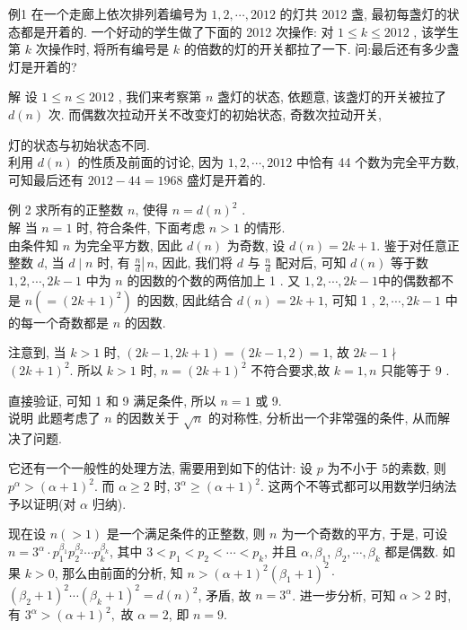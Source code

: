 例1 在一个走廊上依次排列着编号为 $1,2, \cdots, 2012$ 的灯共 2012 盏, 最初每盏灯的状态都是开着的. 一个好动的学生做了下面的 2012 次操作: 对 $1 \leqslant k \leqslant 2012$ , 该学生第 $k$ 次操作时, 将所有编号是 $k$ 的倍数的灯的开关都拉了一下. 问:最后还有多少盏灯是开着的?

解 设 $1 \leqslant n \leqslant 2012$ , 我们来考察第 $n$ 盏灯的状态, 依题意, 该盏灯的开关被拉了 $d(n)$ 次. 而偶数次拉动开关不改变灯的初始状态, 奇数次拉动开关,

灯的状态与初始状态不同.\\
利用 $d(n)$ 的性质及前面的讨论, 因为 $1,2, \cdots, 2012$ 中恰有 44 个数为完全平方数, 可知最后还有 $2012-44=1968$ 盛灯是开着的.

例 2 求所有的正整数 $n$, 使得 $n=d(n)^{2}$ . \\
解 当 $n=1$ 时, 符合条件, 下面考虑 $n>1$ 的情形.\\
由条件知 $n$ 为完全平方数, 因此 $d(n)$ 为奇数, 设 $d(n)=2 k+1$. 鉴于对任意正整数 $d$, 当 $d \mid n$ 时, 有 $\left.\frac{n}{d} \right\rvert\, n$, 因此, 我们将 $d$ 与 $\frac{n}{d}$ 配对后, 可知 $d(n)$ 等于数 $1,2, \cdots, 2 k-1$ 中为 $n$ 的因数的个数的两倍加上 1 . 又 $1,2, \cdots, 2 k-1$中的偶数都不是 $n\left(=(2 k+1)^{2}\right)$ 的因数, 因此结合 $d(n)=2 k+1$, 可知 1 , $2, \cdots, 2 k-1$ 中的每一个奇数都是 $n$ 的因数.

注意到, 当 $k>1$ 时, $(2 k-1,2 k+1)=(2 k-1,2)=1$, 故 $2 k-1 \nmid$ $(2 k+1)^{2}$. 所以 $k>1$ 时, $n=(2 k+1)^{2}$ 不符合要求,故 $k=1, n$ 只能等于 9 .

直接验证, 可知 1 和 9 满足条件, 所以 $n=1$ 或 9.\\
说明 此题考虑了 $n$ 的因数关于 $\sqrt{n}$ 的对称性, 分析出一个非常强的条件, 从而解决了问题.

它还有一个一般性的处理方法, 需要用到如下的估计: 设 $p$ 为不小于 5的素数, 则 $p^{\alpha}>(\alpha+1)^{2}$. 而 $\alpha \geqslant 2$ 时, $3^{\alpha} \geqslant(\alpha+1)^{2}$. 这两个不等式都可以用数学归纳法予以证明(对 $\alpha$ 归纳).

现在设 $n(>1)$ 是一个满足条件的正整数, 则 $n$ 为一个奇数的平方, 于是, 可设 $n=3^{\alpha} \cdot p_{1}^{\beta_{1}} p_{2}^{\beta_{2}} \cdots p_{k}^{\beta_{k}}$, 其中 $3<p_{1}<p_{2}<\cdots<p_{k}$, 并且 $\alpha, \beta_{1}$, $\beta_{2}, \cdots, \beta_{k}$ 都是偶数. 如果 $k>0$, 那么由前面的分析, 知 $n>(\alpha+1)^{2}\left(\beta_{1}+1\right)^{2} \cdot$ $\left(\beta_{2}+1\right)^{2} \cdots\left(\beta_{k}+1\right)^{2}=d(n)^{2}$, 矛盾, 故 $n=3^{\alpha}$. 进一步分析, 可知 $\alpha>2$ 时, 有 $3^{\alpha}>(\alpha+1)^{2} , $ 故 $\alpha=2$, 即 $n=9$.

